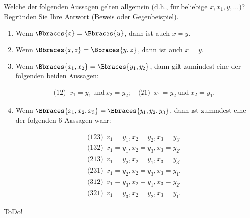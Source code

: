 
\begin{exercise}[1]

Welche der folgenden Aussagen gelten allgemein (d.h., für beliebige $x, x_1, y, \ldots$)?
Begründen Sie Ihre Antwort (Beweis oder Gegenbeispiel).

\begin{enumerate}[label = \alph*.]

    \item Wenn $\Bbraces{x} = \Bbraces{y}$, dann ist auch $x = y$.

    \item Wenn $\Bbraces{x, z} = \Bbraces{y, z}$, dann ist auch $x = y$.

    \item Wenn $\Bbraces{x_1, x_2} = \Bbraces{y_1, y_2}$, dann gilt zumindest eine der folgenden beiden Aussagen:
    
    \begin{align*}
        \text{(12)} \enspace
        x_1 = y_1 ~\text{und}~ x_2 = y_2;
        \quad
        \text{(21)} \enspace
        x_1 = y_2 ~\text{und}~ x_2 = y_1.
    \end{align*}

    \item Wenn $\Bbraces{x_1, x_2, x_3} = \Bbraces{y_1, y_2, y_3}$, dann ist zumindest eine der folgenden 6 Aussagen wahr:
    
    \begin{align*}
        \text{(123)} \enspace
        x_1 = y_1, x_2 = y_2, x_3 = y_3. \\
        \text{(132)} \enspace
        x_1 = y_1, x_2 = y_3, x_3 = y_2. \\
        \text{(213)} \enspace
        x_1 = y_2, x_2 = y_1, x_3 = y_3. \\
        \text{(231)} \enspace
        x_1 = y_2, x_2 = y_3, x_3 = y_1. \\
        \text{(312)} \enspace
        x_1 = y_3, x_2 = y_1, x_3 = y_2. \\
        \text{(321)} \enspace
        x_1 = y_3, x_2 = y_2, x_3 = y_1.
    \end{align*}
\end{enumerate}

\end{exercise}


\begin{solution}

ToDo!

\end{solution}

